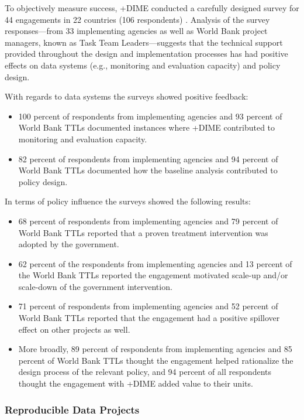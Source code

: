 \documentclass[
]{book}
\providecommand{\tightlist}{%
  \setlength{\itemsep}{0pt}\setlength{\parskip}{0pt}}
\begin{document}
To objectively measure success, +DIME\textbar{} conducted a carefully designed survey for 44 engagements in 22 countries (106 respondents) \citep{legovini}. Analysis of the survey responses---from 33 implementing agencies as well as World Bank project managers, known as Task Team Leaders---suggests that the technical support provided throughout the design and implementation processes has had positive effects on data systems (e.g., monitoring and evaluation capacity) and policy design.

With regards to data systems the surveys showed positive feedback:

\begin{itemize}
\tightlist
\item
  100 percent of respondents from implementing agencies and 93 percent of World Bank TTLs documented instances where +DIME\textbar{} contributed to monitoring and evaluation capacity.
\item
  82 percent of respondents from implementing agencies and 94 percent of World Bank TTLs documented how the baseline analysis contributed to policy design.
\end{itemize}

In terms of policy influence the surveys showed the following results:

\begin{itemize}
\tightlist
\item
  68 percent of respondents from implementing agencies and 79 percent of World Bank TTLs reported that a proven treatment intervention was adopted by the government.
\item
  62 percent of the respondents from implementing agencies and 13 percent of the World Bank TTLs reported the engagement motivated scale-up and/or scale-down of the government intervention.
\item
  71 percent of respondents from implementing agencies and 52 percent of World Bank TTLs reported that the engagement had a positive spillover effect on other projects as well.
\item
  More broadly, 89 percent of respondents from implementing agencies and 85 percent of World Bank TTLs thought the engagement helped rationalize the design process of the relevant policy, and 94 percent of all respondents thought the engagement with +DIME\textbar{} added value to their units.
\end{itemize}

\hypertarget{reproducible-data-projects}{%
\subsubsection*{Reproducible Data Projects}\label{reproducible-data-projects}}
\end{document}
